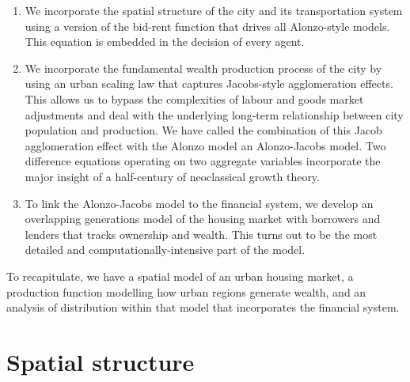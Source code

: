 \begin{enumerate}
\item We incorporate the spatial structure of the city and its transportation system using a version of the \gls{bid-rent function} that drives all Alonzo-style models. This equation is embedded in the decision of every agent.

\item We incorporate the fundamental wealth production process of the city by using an \gls{urban scaling} law that captures Jacobs-style agglomeration effects. This allows us to bypass the complexities of labour and goods market adjustments and deal with the underlying long-term relationship between city  population and production. We have called the combination of this Jacob agglomeration effect with the Alonzo model an \gls{Alonzo-Jacobs model}.  Two difference equations operating on two aggregate variables incorporate the major insight of a half-century of \gls{neoclassical growth theory}.

\item To link the Alonzo-Jacobs model to the financial system, we develop an \gls{overlapping generations model} of the housing market with borrowers and lenders that tracks ownership and wealth. This turns out to be the most detailed and computationally-intensive part of the model.
\end{enumerate}

To recapitulate, we have a spatial model of an urban housing market, a production function modelling how urban regions generate wealth, and an analysis of distribution within that model that incorporates the financial system.

\section{Spatial structure}


